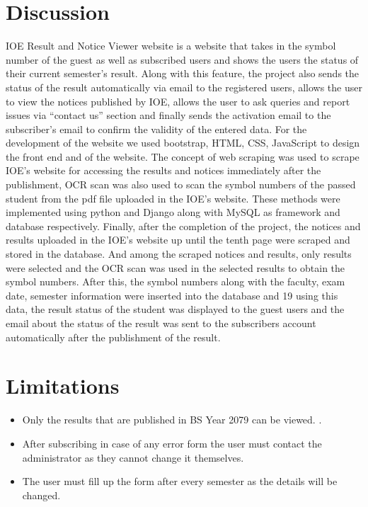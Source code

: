 \section{Discussion}
IOE Result and Notice Viewer website is a website that takes in the symbol number of 
the guest as well as subscribed users and shows the users the status of their current 
semester’s result. Along with this feature, the project also sends the status of the result 
automatically via email to the registered users, allows the user to view the notices 
published by IOE, allows the user to ask queries and report issues via “contact us” 
section and finally sends the activation email to the subscriber’s email to confirm the 
validity of the entered data.
For the development of the website we used bootstrap, HTML, CSS, JavaScript to 
design the front end and of the website. The concept of web scraping was used to scrape 
IOE’s website for accessing the results and notices immediately after the publishment, 
OCR scan was also used to scan the symbol numbers of the passed student from the pdf 
file uploaded in the IOE’s website. These methods were implemented using python and 
Django along with MySQL as framework and database respectively.
Finally, after the completion of the project, the notices and results uploaded in the IOE’s
website up until the tenth page were scraped and stored in the database. And among the 
scraped notices and results, only results were selected and the OCR scan was used in 
the selected results to obtain the symbol numbers. After this, the symbol numbers along 
with the faculty, exam date, semester information were inserted into the database and 
19
using this data, the result status of the student was displayed to the guest users and the 
email about the status of the result was sent to the subscribers account automatically 
after the publishment of the result.

\section{Limitations}
\begin{itemize}
	\item Only the results that are published in BS Year 2079 can be viewed.
.
	\item After subscribing in case of any error form the user must contact the 
administrator as they cannot change it themselves.
	\item The user must fill up the form after every semester as the details will be changed.
	
	
\end{itemize}

